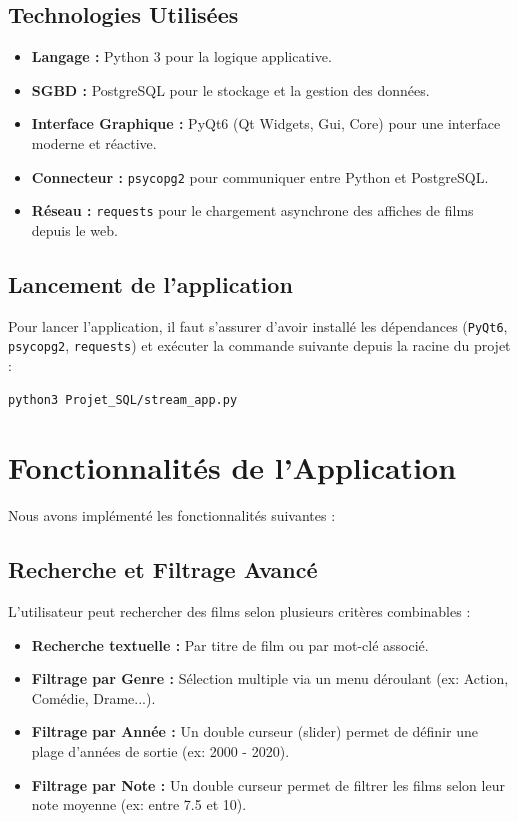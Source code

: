 \documentclass[12pt]{article}
\begin{document}
\subsection{Technologies Utilisées}
\begin{itemize}
    \item \textbf{Langage :} Python 3 pour la logique applicative.
    \item \textbf{SGBD :} PostgreSQL pour le stockage et la gestion des données.
    \item \textbf{Interface Graphique :} PyQt6 (Qt Widgets, Gui, Core) pour une interface moderne et réactive.
    \item \textbf{Connecteur :} \texttt{psycopg2} pour communiquer entre Python et PostgreSQL.
    \item \textbf{Réseau :} \texttt{requests} pour le chargement asynchrone des affiches de films depuis le web.
\end{itemize}

\subsection{Lancement de l'application}
Pour lancer l'application, il faut s'assurer d'avoir installé les dépendances (\texttt{PyQt6}, \texttt{psycopg2}, \texttt{requests}) et exécuter la commande suivante depuis la racine du projet :

\begin{lstlisting}[language=bash]
python3 Projet_SQL/stream_app.py
\end{lstlisting}

\newpage
\section{Fonctionnalités de l'Application}

Nous avons implémenté les fonctionnalités suivantes :

\subsection{Recherche et Filtrage Avancé}
L'utilisateur peut rechercher des films selon plusieurs critères combinables :
\begin{itemize}
    \item \textbf{Recherche textuelle :} Par titre de film ou par mot-clé associé.
    \item \textbf{Filtrage par Genre :} Sélection multiple via un menu déroulant (ex: Action, Comédie, Drame...).
    \item \textbf{Filtrage par Année :} Un double curseur (slider) permet de définir une plage d'années de sortie (ex: 2000 - 2020).
    \item \textbf{Filtrage par Note :} Un double curseur permet de filtrer les films selon leur note moyenne (ex: entre 7.5 et 10).
\end{itemize}
\end{document}
